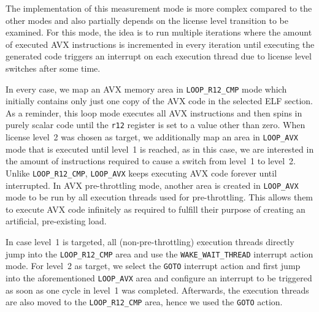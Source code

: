 The implementation of this measurement mode is more complex compared to the other modes and also partially depends on the license level transition to be examined. For this mode, the idea is to run multiple iterations where the amount of executed \gls{AVX} instructions is incremented in every iteration until executing the generated code triggers an interrupt on each execution thread due to license level switches after some time.

In every case, we map an \gls{AVX} memory area in \texttt{LOOP\_R12\_CMP} mode which initially contains only just one copy of the \gls{AVX} code in the selected \gls{ELF} section. As a reminder, this loop mode executes all \gls{AVX} instructions and then spins in purely scalar code until the \texttt{r12} register is set to a value other than zero. When license level~2 was chosen as target, we additionally map an area in \texttt{LOOP\_AVX} mode that is executed until level~1 is reached, as in this case, we are interested in the amount of instructions required to cause a switch from level~1 to level~2. Unlike \texttt{LOOP\_R12\_CMP}, \texttt{LOOP\_AVX} keeps executing \gls{AVX} code forever until interrupted. In \gls{AVX} pre-throttling mode, another area is created in \texttt{LOOP\_AVX} mode to be run by all execution threads used for pre-throttling. This allows them to execute \gls{AVX} code infinitely as required to fulfill their purpose of creating an artificial, pre-existing load.

In case level~1 is targeted, all (non-pre-throttling) execution threads directly jump into the \texttt{LOOP\_R12\_CMP} area and use the \texttt{WAKE\_WAIT\_THREAD} interrupt action mode. For level~2 as target, we select the \texttt{GOTO} interrupt action and first jump into the aforementioned \texttt{LOOP\_AVX} area and configure an interrupt to be triggered as soon as one cycle in level~1 was completed. Afterwards, the execution threads are also moved to the \texttt{LOOP\_R12\_CMP} area, hence we used the \texttt{GOTO} action. 

